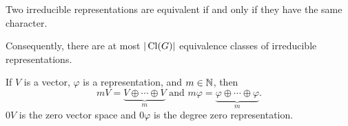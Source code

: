 		\begin{fcor}
			Two irreducible representations are equivalent if and only if they have the same character.
		\end{fcor}

		Consequently, there are at most $|\operatorname{Cl}(G)|$ equivalence classes of irreducible representations.

		\begin{definition}
			If $V$ is a vector, $\varphi$ is a representation, and $m \in \mathbb{N}$, then
			\[ mV = \underbrace{V \oplus \cdots \oplus V}_{m} \text{ and } m\varphi = \underbrace{\varphi \oplus \cdots \oplus \varphi}_{m}. \]
			$0V$ is the zero vector space and $0\varphi$ is the degree zero representation.
		\end{definition}

		